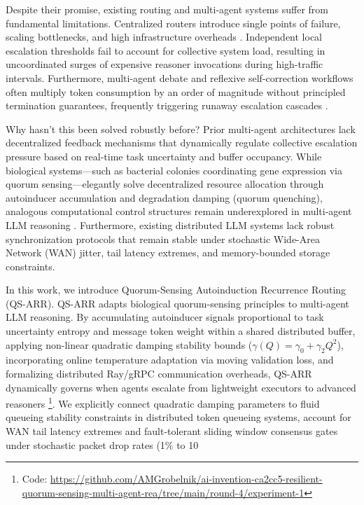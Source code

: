 \documentclass[11pt,letterpaper]{article}
\begin{document}
Despite their promise, existing routing and multi-agent systems suffer from fundamental limitations. Centralized routers introduce single points of failure, scaling bottlenecks, and high infrastructure overheads \citep{Wu2023}. Independent local escalation thresholds fail to account for collective system load, resulting in uncoordinated surges of expensive reasoner invocations during high-traffic intervals. Furthermore, multi-agent debate and reflexive self-correction workflows often multiply token consumption by an order of magnitude without principled termination guarantees, frequently triggering runaway escalation cascades \citep{Shinn2023}.

Why hasn't this been solved robustly before? Prior multi-agent architectures lack decentralized feedback mechanisms that dynamically regulate collective escalation pressure based on real-time task uncertainty and buffer occupancy. While biological systems—such as bacterial colonies coordinating gene expression via quorum sensing—elegantly solve decentralized resource allocation through autoinducer accumulation and degradation damping (quorum quenching), analogous computational control structures remain underexplored in multi-agent LLM reasoning \citep{Miller2001}. Furthermore, existing distributed LLM systems lack robust synchronization protocols that remain stable under stochastic Wide-Area Network (WAN) jitter, tail latency extremes, and memory-bounded storage constraints.

In this work, we introduce Quorum-Sensing Autoinduction Recurrence Routing (QS-ARR). QS-ARR adapts biological quorum-sensing principles to multi-agent LLM reasoning. By accumulating autoinducer signals proportional to task uncertainty entropy and message token weight within a shared distributed buffer, applying non-linear quadratic damping stability bounds ($\gamma(Q) = \gamma_0 + \gamma_2 Q^2$), incorporating online temperature adaptation via moving validation loss, and formalizing distributed Ray/gRPC communication overheads, QS-ARR dynamically governs when agents escalate from lightweight executors to advanced reasoners \footnote{Code: \url{https://github.com/AMGrobelnik/ai-invention-ca2cc5-resilient-quorum-sensing-multi-agent-rea/tree/main/round-4/experiment-1}}. We explicitly connect quadratic damping parameters to fluid queueing stability constraints in distributed token queueing systems, account for WAN tail latency extremes and fault-tolerant sliding window consensus gates under stochastic packet drop rates (1\% to 10%
\end{document}
